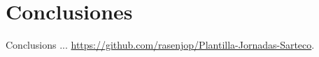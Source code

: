 \section{Conclusiones}

Conclusions ...
\url{https://github.com/rasenjop/Plantilla-Jornadas-Sarteco}.